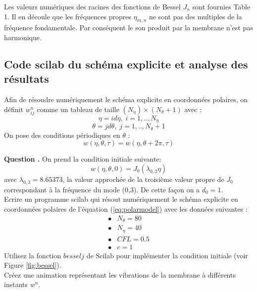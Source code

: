 \documentclass[a4,12pt]{article}
\newcounter{Nbquestion}
\newcommand*\question{%
\stepcounter{Nbquestion}%
\textbf{Question \theNbquestion. }}
\begin{document}
Les valeurs numériques des racines des fonctions de Bessel $J_n$ sont fournies Table 1. Il en découle que les fréquences propres $\eta_{m,n}$ ne sont pas des multiples de la fréquence fondamentale. Par conséquent le son produit par la membrane n'est pas harmonique.

\newpage 

\subsection{Code scilab du schéma explicite et analyse des résultats}

Afin de résoudre numériquement le schéma explicite en coordonnées polaires, on définit $w_{ij}^n$ comme un tableau de taille $(N_\eta)\times(N_\theta+1)$ avec :
\[
\eta=id\eta ,\;i=1,..,N_\eta
\]
\[
\theta=jd\theta ,\;j=1,..,N_\theta+1
\]
On pose des conditions périodiques en $\theta$ :
\[
w(\eta,\theta,\tau)=w(\eta,\theta+2\pi,\tau)
\]


\begin{mdframed}[style=exampledefault]
\question On prend la condition initiale suivante:
\begin{equation}
	w(\eta,\theta,0)=J_0(\lambda_{0,3}\eta)
	\label{eq:condinit}
\end{equation}
avec $\lambda_{0,3}=8.65373$, la valeur approchée de la troisième valeur propre de $J_0$ correspondant à la fréquence du mode (0,3). De cette façon on a $d_0=1$.\\

Ecrire un programme scilab qui résout numériquement le schéma explicite en coordonnées polaires de l'équation (\ref{eq:polarmodel}) avec les données suivantes : 
\[
\begin{array}{ll}
	\bullet & N_\theta=80 \\ 
	\bullet & N_\eta=40 \\ 
	\bullet & CFL=0.5 \\ 
	\bullet & c=1
\end{array}
\]
Utilisez la fonction $besselj$ de Scilab pour implémenter la condition initiale (voir Figure \ref{fig:bessel}).\\
Créez une animation représentant les vibrations de la membrane à différents instants $w^n$.
\end{mdframed}

\end{document}

